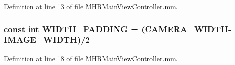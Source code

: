 Definition at line 13 of file M\+H\+R\+Main\+View\+Controller.\+mm.

\hypertarget{_m_h_r_main_view_controller_8mm_a3f33c36bfbff665a75263b4578776a71}{
\subsubsection[{W\+I\+D\+T\+H\+\_\+\+P\+A\+D\+D\+I\+N\+G}]{\setlength{\rightskip}{0pt plus 5cm}const int W\+I\+D\+T\+H\+\_\+\+P\+A\+D\+D\+I\+N\+G = ({\bf C\+A\+M\+E\+R\+A\+\_\+\+W\+I\+D\+T\+H}-\/{\bf I\+M\+A\+G\+E\+\_\+\+W\+I\+D\+T\+H})/2}}\label{_m_h_r_main_view_controller_8mm_a3f33c36bfbff665a75263b4578776a71}


Definition at line 18 of file M\+H\+R\+Main\+View\+Controller.\+mm.

